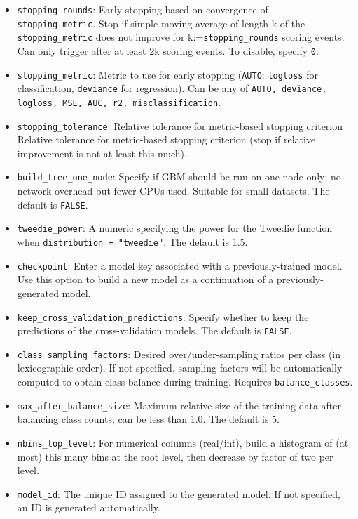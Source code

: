\begin{itemize}
\item \texttt{stopping\_rounds}: Early stopping based on convergence of \\\texttt{stopping\_metric}. Stop if simple moving average of length k of the \texttt{stopping\_metric} does not improve for k:=\texttt{stopping\_rounds} scoring events. Can only trigger after at least 2k scoring events. To disable, specify \texttt{0}.
\item \texttt{stopping\_metric}: Metric to use for early stopping (\texttt{AUTO}: \texttt{logloss} for classification, \texttt{deviance} for regression). Can be any of \texttt{AUTO, deviance, logloss, MSE, AUC, r2, misclassification}.
\item \texttt{stopping\_tolerance}: Relative tolerance for metric-based stopping criterion Relative tolerance for metric-based stopping criterion (stop if relative improvement is not at least this much).
\item {\texttt{build\_tree\_one\_node}}: Specify if GBM should be run on one node only; no network overhead but fewer CPUs used. Suitable for small datasets.  The default is {\texttt{FALSE}}.
\item {\texttt{tweedie\_power}}: A numeric specifying the power for the Tweedie function when \texttt{distribution = "tweedie"}.  The default is 1.5.
\item {\texttt{checkpoint}}: Enter a model key associated with a previously-trained model. Use this option to build a new model as a continuation of a previously-generated model.
\item {\texttt{keep\_cross\_validation\_predictions}}: Specify whether to keep the predictions of the cross-validation models.   The default is {\texttt{FALSE}}.
\item {\texttt{class\_sampling\_factors}}: Desired over/under-sampling ratios per class (in lexicographic order). If not specified, sampling factors will be automatically computed to obtain class balance during training. Requires \texttt{balance\_classes}.
\item {\texttt{max\_after\_balance\_size}}: Maximum relative size of the training data after balancing class counts; can be less than 1.0.  The default is 5.
\item {\texttt{nbins\_top\_level}}: For numerical columns (real/int), build a histogram of (at most) this many bins at the root level, then decrease by factor of two per level.
\item \texttt{model\_id}: The unique ID assigned to the generated model. If not specified, an ID is generated automatically.
\end{itemize}

